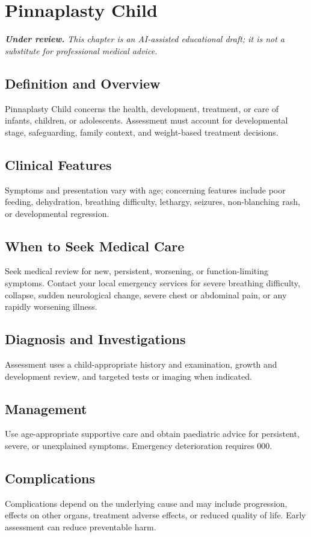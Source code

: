 \chapter{Pinnaplasty Child}

\medskip
\noindent\textit{\textbf{Under review.} This chapter is an AI-assisted educational draft; it is not a substitute for professional medical advice.}

\section*{Definition and Overview}
Pinnaplasty Child concerns the health, development, treatment, or care of infants, children, or adolescents. Assessment must account for developmental stage, safeguarding, family context, and weight-based treatment decisions.

\section*{Clinical Features}
Symptoms and presentation vary with age; concerning features include poor feeding, dehydration, breathing difficulty, lethargy, seizures, non-blanching rash, or developmental regression.

\section*{When to Seek Medical Care}
Seek medical review for new, persistent, worsening, or function-limiting symptoms. Contact your local emergency services for severe breathing difficulty, collapse, sudden neurological change, severe chest or abdominal pain, or any rapidly worsening illness.

\section*{Diagnosis and Investigations}
Assessment uses a child-appropriate history and examination, growth and development review, and targeted tests or imaging when indicated.

\section*{Management}
Use age-appropriate supportive care and obtain paediatric advice for persistent, severe, or unexplained symptoms. Emergency deterioration requires 000.

\section*{Complications}
Complications depend on the underlying cause and may include progression, effects on other organs, treatment adverse effects, or reduced quality of life. Early assessment can reduce preventable harm.

